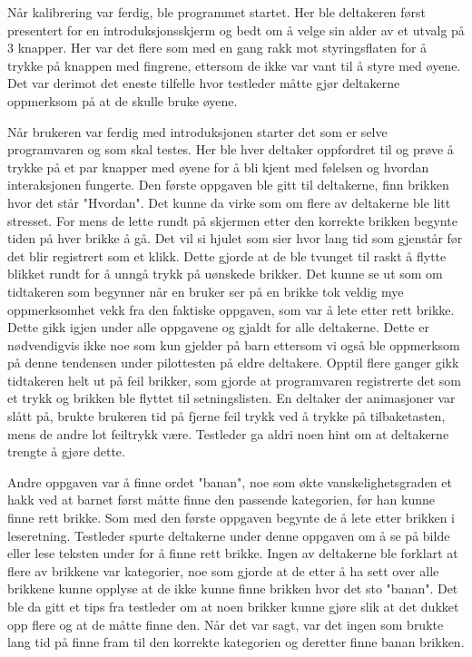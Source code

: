 Når kalibrering var ferdig, ble programmet startet. Her ble deltakeren først presentert for en introduksjonsskjerm og bedt om å velge sin alder av et utvalg på 3 knapper. Her var det flere som med en gang rakk mot styringsflaten for å trykke på knappen med fingrene, ettersom de ikke var vant til å styre med øyene. Det var derimot det eneste tilfelle hvor testleder måtte gjør deltakerne oppmerksom på at de skulle bruke øyene. 
 
Når brukeren var ferdig med introduksjonen starter det som er selve programvaren og som skal testes. Her ble hver deltaker oppfordret til og prøve å trykke på et par knapper med øyene for å bli kjent med følelsen og hvordan interaksjonen fungerte. Den første oppgaven ble gitt til deltakerne, finn brikken hvor det står "Hvordan". Det kunne da virke som om flere av deltakerne ble litt stresset. For mens de lette rundt på skjermen etter den korrekte brikken begynte tiden på hver brikke å gå. Det vil si hjulet som sier hvor lang tid som gjenstår før det blir registrert som et klikk. Dette gjorde at de ble tvunget til raskt å flytte blikket rundt for å unngå trykk på uønskede brikker. Det kunne se ut som om tidtakeren som begynner når en bruker ser på en brikke tok veldig mye oppmerksomhet vekk fra den faktiske oppgaven, som var å lete etter rett brikke. Dette gikk igjen under alle oppgavene og gjaldt for alle deltakerne. Dette er nødvendigvis ikke noe som kun gjelder på barn ettersom vi også ble oppmerksom på denne tendensen under pilottesten på eldre deltakere. Opptil flere ganger gikk tidtakeren helt ut på feil brikker, som gjorde at programvaren registrerte det som et trykk og brikken ble flyttet til setningslisten. En deltaker  der animasjoner var slått på, brukte brukeren tid på fjerne feil trykk ved å trykke på tilbaketasten, mens de andre lot feiltrykk være. Testleder ga aldri noen hint om at deltakerne trengte å gjøre dette.  
 
 
Andre oppgaven var å finne ordet "banan", noe som økte vanskelighetsgraden et hakk ved at barnet først måtte finne den passende kategorien, før han kunne finne rett brikke. Som med den første oppgaven begynte de å lete etter brikken i leseretning. Testleder spurte deltakerne under denne oppgaven om å se på bilde eller lese teksten under for å finne rett brikke. Ingen av deltakerne ble forklart at flere av brikkene var kategorier, noe som gjorde at de etter å ha sett over alle brikkene kunne opplyse at de ikke kunne finne brikken hvor det sto "banan". Det ble da gitt et tips fra testleder om at noen brikker kunne gjøre slik at det dukket opp flere og at de måtte finne den. Når det var sagt, var det ingen som brukte lang tid på finne fram til den korrekte kategorien og deretter finne banan brikken.  
 
